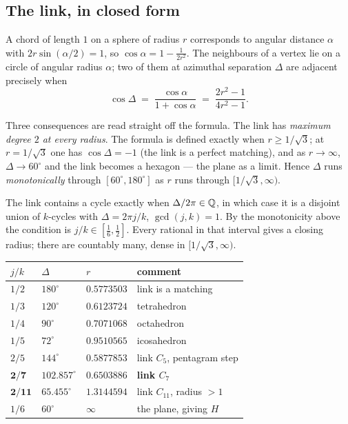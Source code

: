 \subsection{The link, in closed form}
\label{sec:link}

A chord of length $1$ on a sphere of radius $r$ corresponds to angular distance
$\alpha$ with $2r\sin(\alpha/2)=1$, so $\cos\alpha = 1-\frac{1}{2r^2}$. The
neighbours of a vertex lie on a circle of angular radius $\alpha$; two of them
at azimuthal separation $\Delta$ are adjacent precisely when
\[
\cos\Delta \;=\; \frac{\cos\alpha}{1+\cos\alpha}\;=\;\frac{2r^2-1}{4r^2-1}.
\]

Three consequences are read straight off the formula. The link has
\emph{maximum degree $2$ at every radius}. The formula is defined exactly when
$r\ge1/\sqrt3$; at $r=1/\sqrt3$ one has $\cos\Delta=-1$ (the link is a perfect
matching), and as $r\to\infty$, $\Delta\to60^\circ$ and the link becomes a
hexagon --- the plane as a limit. Hence $\Delta$ runs \emph{monotonically}
through $[60^\circ,180^\circ]$ as $r$ runs through $[1/\sqrt3,\infty)$.

\begin{proposition}
\label{prop:radii}
The link contains a cycle exactly when $\Delta/2\pi\in\mathbb{Q}$, in which case it is a
disjoint union of $k$-cycles with $\Delta=2\pi j/k$, $\gcd(j,k)=1$. By the
monotonicity above the condition is $j/k\in[\tfrac16,\tfrac12]$. Every rational
in that interval gives a closing radius; there are countably many, dense in
$[1/\sqrt3,\infty)$.
\end{proposition}

\begin{center}
\begin{tabular}{@{}llll@{}}
\toprule
$j/k$ & $\Delta$ & $r$ & comment \\
\midrule
$1/2$ & $180^\circ$ & $0.5773503$ & link is a matching \\
$1/3$ & $120^\circ$ & $0.6123724$ & tetrahedron \\
$1/4$ & $90^\circ$ & $0.7071068$ & octahedron \\
$1/5$ & $72^\circ$ & $0.9510565$ & icosahedron \\
$2/5$ & $144^\circ$ & $0.5877853$ & link $C_5$, pentagram step \\
$\mathbf{2/7}$ & $102.857^\circ$ & $\mathbf{0.6503886}$ & \textbf{link $C_7$} \\
$\mathbf{2/11}$ & $65.455^\circ$ & $\mathbf{1.3144594}$ & link $C_{11}$,
radius $>1$ \\
$1/6$ & $60^\circ$ & $\infty$ & the plane, giving $H$ \\
\bottomrule
\end{tabular}
\end{center}

